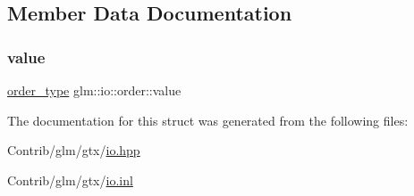 \subsection{Member Data Documentation}
\mbox{\label{structglm_1_1io_1_1order_aa8788dd0568bacd081d02bd5aca9889b}} 
\subsubsection{\texorpdfstring{value}{value}}
{\footnotesize\ttfamily \mbox{\hyperlink{namespaceglm_1_1io_a3497781803fe594a37177e05ab2a795f}{order\+\_\+type}} glm\+::io\+::order\+::value}



The documentation for this struct was generated from the following files\+:\begin{DoxyCompactItemize}
\item 
Contrib/glm/gtx/\mbox{\hyperlink{io_8hpp}{io.\+hpp}}\item 
Contrib/glm/gtx/\mbox{\hyperlink{io_8inl}{io.\+inl}}\end{DoxyCompactItemize}

